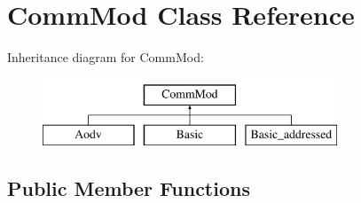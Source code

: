 \hypertarget{class_comm_mod}{}\section{Comm\+Mod Class Reference}
\label{class_comm_mod}
Inheritance diagram for Comm\+Mod\+:\begin{figure}[H]
\begin{center}
\leavevmode
\includegraphics[height=2.000000cm]{class_comm_mod}
\end{center}
\end{figure}
\subsection*{Public Member Functions}
